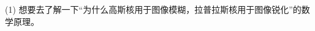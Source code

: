 \documentclass[letterpaper,12pt]{article}
\begin{document}
	(1) 想要去了解一下“为什么高斯核用于图像模糊，拉普拉斯核用于图像锐化”的数学原理。
	
	
	
	
\end{document}
